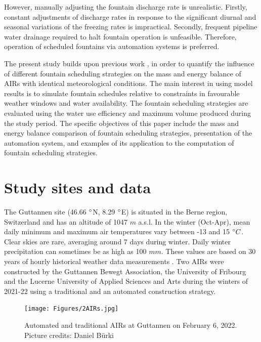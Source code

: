 \documentclass[tc, manuscript]{copernicus}
\begin{document}
However, manually adjusting the fountain discharge rate is unrealistic. Firstly, constant adjustments of
discharge rates in response to the significant diurnal and seasonal variations of the freezing rates is
impractical. Secondly, frequent pipeline water drainage required to halt fountain operation is unfeasible.
Therefore, operation of scheduled fountains via automation systems is preferred.

The present study builds upon previous work \citep{balasubramanianInfluenceMeteorologicalConditions2022,
oerlemansBriefCommunicationGrowth2021}, in order to quantify the influence of different fountain scheduling
strategies on the mass and energy balance of AIRs with identical meteorological conditions. The main interest in
using model results is to simulate fountain schedules relative to constraints in favourable weather windows and
water availability. The fountain scheduling strategies are evaluated using the water use efficiency and maximum
volume produced during the study period. The specific objectives of this paper include the mass and energy
balance comparison of fountain scheduling strategies, presentation of the automation system, and examples of its
application to the computation of fountain scheduling strategies.

\section{Study sites and data}

The Guttannen site (46.66 $^{\circ}$N, 8.29 $^{\circ}$E) is situated in the Berne region, Switzerland and has an
altitude of 1047 $m$ a.s.l. In the winter (Oct-Apr), mean daily minimum and maximum air temperatures vary
between -13 and 15 $^{\circ} C$. Clear skies are rare, averaging around 7 days during winter. Daily winter
precipitation can sometimes be as high as 100 $mm$. These values are based on 30 years of hourly historical
weather data measurements \citep{meteoblueClimateGuttannen2021}. Two AIRs were constructed by the Guttannen
Bewegt Association, the University of Fribourg and the Lucerne University of Applied Sciences and Arts during
the winters of 2021-22 using a traditional and an automated construction strategy.

\begin{figure}[t]
\texttt{[image: Figures/2AIRs.jpg]}
\caption{Automated and traditional AIRs at Guttannen on February 6, 2022. Picture credits: Daniel Bürki}
\label{fig:2AIR} 
\end{figure}
\end{document}
